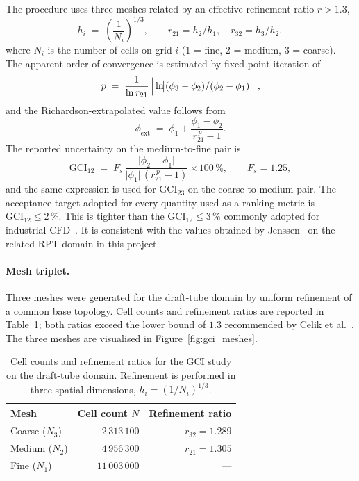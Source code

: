 The procedure uses three meshes related by an effective refinement ratio $r > 1.3$,
\begin{equation}
h_i \;=\; \!\left(\frac{1}{N_i}\right)^{1/3}, \qquad
r_{21} = h_2 / h_1, \quad r_{32} = h_3 / h_2,
\label{eq:GCI_h_r}
\end{equation}
where $N_i$ is the number of cells on grid $i$ (1 = fine, 2 = medium, 3 = coarse). The apparent order of convergence is estimated by fixed-point iteration of
\begin{equation}
p \;=\; \frac{1}{\ln r_{21}} \,\Bigl|\,\ln\!\bigl|(\phi_3 - \phi_2)/(\phi_2 - \phi_1)\bigr|\,\Bigr|,
\label{eq:GCI_p}
\end{equation}
and the Richardson-extrapolated value follows from
\begin{equation}
\phi_{\mathrm{ext}} \;=\; \phi_1 + \frac{\phi_1 - \phi_2}{r_{21}^{\,p} - 1}.
\label{eq:GCI_extrap}
\end{equation}
The reported uncertainty on the medium-to-fine pair is
\begin{equation}
\mathrm{GCI}_{12} \;=\; F_s\,\frac{\bigl|\phi_2 - \phi_1\bigr|}{\bigl|\phi_1\bigr|\,(r_{21}^{\,p} - 1)} \times 100\,\%, \qquad F_s = 1.25,
\label{eq:GCI_def}
\end{equation}
and the same expression is used for $\mathrm{GCI}_{23}$ on the coarse-to-medium pair. The acceptance target adopted for every quantity used as a ranking metric is $\mathrm{GCI}_{12} \leq 2\,\%$. This is tighter than the $\mathrm{GCI}_{12} \leq 3\,\%$ commonly adopted for industrial CFD~\cite{Celik2008}. It is consistent with the values obtained by Jenssen~\cite{Jenssen2020} on the related RPT domain in this project.

\paragraph{Mesh triplet.}
Three meshes were generated for the draft-tube domain by uniform refinement of a common base topology. Cell counts and refinement ratios are reported in Table~\ref{tab:gci_meshes}; both ratios exceed the lower bound of $1.3$ recommended by Celik et al.~\cite{Celik2008}. The three meshes are visualised in Figure~\ref{fig:gci_meshes}.

\begin{table}[h!]
  \centering
  \caption[Mesh triplet for the GCI study]{Cell counts and refinement ratios for the GCI study on the draft-tube domain. Refinement is performed in three spatial dimensions, $h_i = (1/N_i)^{1/3}$.}
  \label{tab:gci_meshes}
  \small
  \begin{tabular}{l r r}
    \toprule
    \textbf{Mesh}  & \textbf{Cell count $N$}  & \textbf{Refinement ratio} \\
    \midrule
    Coarse ($N_3$) & $2\,313\,100$            & $r_{32} = 1.289$ \\
    Medium ($N_2$) & $4\,956\,300$            & $r_{21} = 1.305$ \\
    Fine   ($N_1$) & $11\,003\,000$           & --- \\
    \bottomrule
  \end{tabular}
\end{table}

